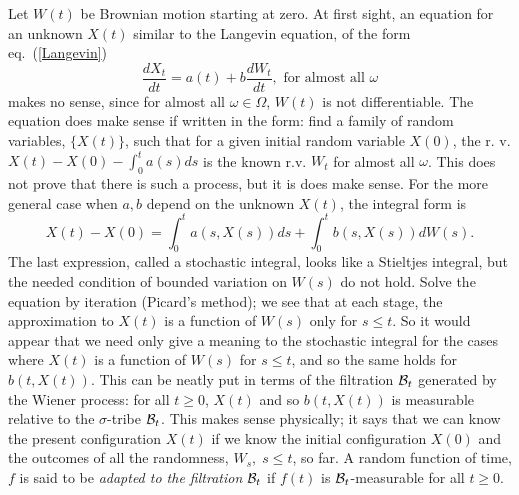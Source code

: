 Let $W(t)$ be Brownian motion starting at zero. At first sight, an equation
for an unknown $X(t)$ similar to the Langevin equation, of the form
eq.~(\ref{Langevin})
\[\frac{dX_t}{dt}=a(t)+b\frac{dW_t}{dt}, \mbox{ for almost all }\omega\]
makes no sense, since for almost all $\omega\in\Omega$, $W(t)$ is not
differentiable. The equation does make sense if written in the form:
find a family of random variables, $\{X(t)\}$, such that
for a given initial random variable $X(0)$, the r. v.
$X(t)-X(0)-\int_0^ta(s)ds$ 
is the known r.v. $W_t$ for almost all $\omega$. This does not prove that
there is such a process, but it is does make sense. For the more general
case when $a,b$ depend on the unknown $X(t)$, the integral form is
\begin{equation}
X(t)-X(0)=\int_0^ta(s,X(s))ds+\int_0^tb(s,X(s))dW(s).
\label{Itoequation}
\end{equation}
The last expression, called a stochastic integral, looks like a Stieltjes
integral, but the needed condition of bounded variation on $W(s)$ do not
hold.
Solve the equation by iteration (Picard's method); we see that
at each stage, the approximation to $X(t)$ is a function of $W(s)$ only for
$s\leq t$. So it would appear that we need only
give a meaning to the stochastic integral for the cases where $X(t)$
is a function of $W(s)$ for $s\leq t$, and so the same holds for $b(t,X(t))$.
This can be neatly put in terms of the filtration ${\cal B}_t$ generated by
the Wiener process: for all $t\geq 0$, $X(t)$ and so $b(t,X(t))$
is measurable relative to the $\sigma$-tribe
${\cal B}_t$. This makes sense physically; it says that
we can know the present configuration $X(t)$ if we know the initial
configuration $X(0)$ and the outcomes of all the randomness, $W_s,\;s\leq
t$, so far. A random function of time, $f$ is said to be {\em adapted to
the filtration} ${\cal B}_t$ if $f(t)$ is ${\cal B}_t$-measurable for all
$t\geq0$. 

